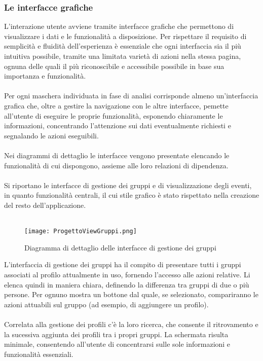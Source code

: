 \subsubsection{Le interfacce grafiche}
L'interazione utente avviene tramite interfacce grafiche 
che permettono di visualizzare i dati e le funzionalità a disposizione. 
Per rispettare il requisito di semplicità e fluidità dell'esperienza è essenziale che 
ogni interfaccia sia il più intuitiva possibile, tramite una limitata varietà di azioni nella stessa pagina,
ognuna delle quali il più riconoscibile e accessibile possibile in base sua importanza e funzionalità.\\
\\
Per ogni maschera individuata in fase di analisi corrisponde almeno un'interfaccia grafica che, 
oltre a gestire la navigazione con le altre interfacce, 
pemette all'utente di eseguire le proprie funzionalità,
esponendo chiaramente le informazioni,
concentrando l'attenzione sui dati eventualmente richiesti e segnalando le azioni eseguibili.\\
\\
Nei diagrammi di dettaglio le interfacce vengono presentate elencando le funzionalità di cui dispongono, 
assieme alle loro relazioni di dipendenza. \\
\\
Si riportano le interfacce di gestione dei gruppi e di visualizzazione degli eventi, 
in quanto funzionalità centrali, il cui stile grafico è stato rispettato nella creazione del resto dell'applicazione.\\
\\
\begin{figure}[htbp]
    \begin{center}
        \texttt{[image: ProgettoViewGruppi.png]}
        \caption{Diagramma di dettaglio delle interfacce di gestione dei gruppi}
    \end{center}
\end{figure}
\clearpage
L'interfaccia di gestione dei gruppi ha il compito di presentare tutti i gruppi associati al profilo attualmente in uso,
fornendo l'accesso alle azioni relative. 
Li elenca quindi in maniera chiara, definendo la differenza tra gruppi di due o più persone.
Per ognuno mostra un bottone dal quale, se selezionato, compariranno le azioni attuabili sul gruppo 
(ad esempio, di aggiungere un profilo).\\
\\
Correlata alla gestione dei profili c'è la loro ricerca, 
che consente il ritrovamento e la sucessiva aggiunta dei profili tra i propri gruppi.
La schermata risulta minimale, consentendo all'utente di concentrarsi sulle sole informazioni e funzionalità essenziali.\\
\\


